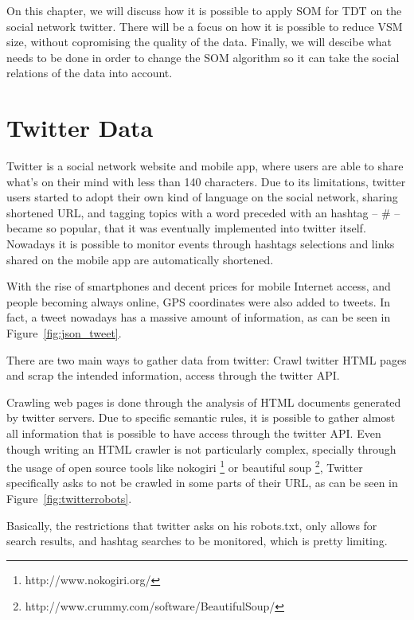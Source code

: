\label{ch:clustering_tweets}
On this chapter, we will discuss how it is possible to apply \ac{SOM} for \ac{TDT} on the social network twitter. There will be a focus on how it is possible to reduce \ac{VSM} size, without copromising the quality of the data. 
Finally, we will descibe what needs to be done in order to change the \ac{SOM} algorithm so it can take the social relations of the data into account. 

\section{Twitter Data}
\label{sec:crawling_twitter}
Twitter is a social network website and mobile app, where users are able to share what's on their mind with less than 140 characters. Due to its limitations, twitter users started to adopt their own kind of language on the social network, sharing shortened \ac{URL}, and tagging topics with a word preceded with an hashtag -- \# -- became so popular, that it was eventually implemented into twitter itself. Nowadays it is possible to monitor events through hashtags selections and links shared on the mobile app are automatically shortened.   

With the rise of smartphones and decent prices for mobile Internet access, and people becoming always online, GPS coordinates were also added to tweets. In fact, a tweet nowadays has a massive amount of information, as can be seen in Figure~\ref{fig:json_tweet}.

There are two main ways to gather data from twitter: Crawl twitter HTML pages and scrap the intended information, access through the twitter API.

Crawling web pages is done through the analysis of HTML documents generated by twitter servers. Due to specific semantic rules, it is possible to gather almost all information that is possible to have access through the twitter API. Even though writing an HTML crawler is not particularly complex, specially through the usage of open source tools like nokogiri \footnote{http://www.nokogiri.org/} or beautiful soup \footnote{http://www.crummy.com/software/BeautifulSoup/}, Twitter specifically asks to not be crawled in some parts of their \ac{URL}, as can be seen in Figure~\ref{fig:twitterrobots}. 

Basically, the restrictions that twitter asks on his robots.txt, only allows for search results, and hashtag searches to be monitored, which is pretty limiting.

